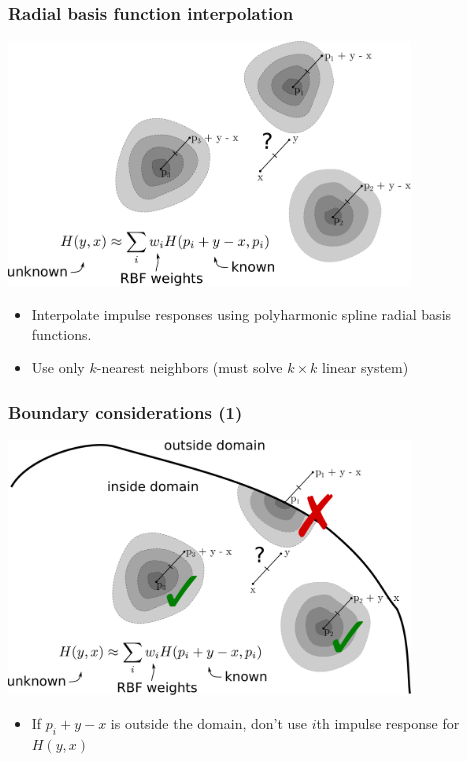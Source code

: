 \documentclass[10pt,final,xcolor=dvipsnames]{beamer}
\begin{document}
\begin{frame}
	\frametitle{Radial basis function interpolation}
	\begin{center}
		\includegraphics[width=0.8\textwidth]{interpolation_rbf.pdf}
	\end{center}
	\begin{itemize}
		\item Interpolate impulse responses using polyharmonic spline radial basis functions.
		\item Use only $k$-nearest neighbors (must solve $k \times k$ linear system)
	\end{itemize}
\end{frame}

\begin{frame}
	\frametitle{Boundary considerations (1)}
	\begin{center}
		\includegraphics[width=0.8\textwidth]{interpolation_rbf_boundary.pdf}
	\end{center}
	\begin{itemize}
		\item If $p_i + y - x$ is outside the domain, don't use $i$th impulse response for $H(y,x)$
	\end{itemize}
\end{frame}
\end{document}
